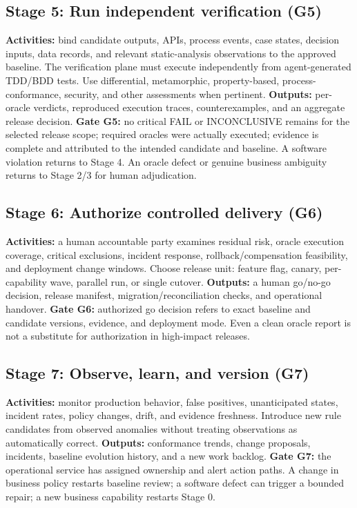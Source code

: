\documentclass[11pt,a4paper]{article}
\newcommand{\FAIL}{\textsf{FAIL}}
\newcommand{\INC}{\textsf{INCONCLUSIVE}}
\begin{document}
\subsection{Stage 5: Run independent verification (G5)}
\textbf{Activities:} bind candidate outputs, APIs, process events, case states, decision inputs, data records, and relevant static-analysis observations to the approved baseline. The verification plane must execute independently from agent-generated TDD/BDD tests. Use differential, metamorphic, property-based, process-conformance, security, and other assessments when pertinent. \textbf{Outputs:} per-oracle verdicts, reproduced execution traces, counterexamples, and an aggregate release decision. \textbf{Gate G5:} no critical \FAIL{} or \INC{} remains for the selected release scope; required oracles were actually executed; evidence is complete and attributed to the intended candidate and baseline. A software violation returns to Stage 4. An oracle defect or genuine business ambiguity returns to Stage 2/3 for human adjudication.

\subsection{Stage 6: Authorize controlled delivery (G6)}
\textbf{Activities:} a human accountable party examines residual risk, oracle execution coverage, critical exclusions, incident response, rollback/compensation feasibility, and deployment change windows. Choose release unit: feature flag, canary, per-capability wave, parallel run, or single cutover. \textbf{Outputs:} a human go/no-go decision, release manifest, migration/reconciliation checks, and operational handover. \textbf{Gate G6:} authorized go decision refers to exact baseline and candidate versions, evidence, and deployment mode. Even a clean oracle report is not a substitute for authorization in high-impact releases.

\subsection{Stage 7: Observe, learn, and version (G7)}
\textbf{Activities:} monitor production behavior, false positives, unanticipated states, incident rates, policy changes, drift, and evidence freshness. Introduce new rule candidates from observed anomalies without treating observations as automatically correct. \textbf{Outputs:} conformance trends, change proposals, incidents, baseline evolution history, and a new work backlog. \textbf{Gate G7:} the operational service has assigned ownership and alert action paths. A change in business policy restarts baseline review; a software defect can trigger a bounded repair; a new business capability restarts Stage 0.
\end{document}
